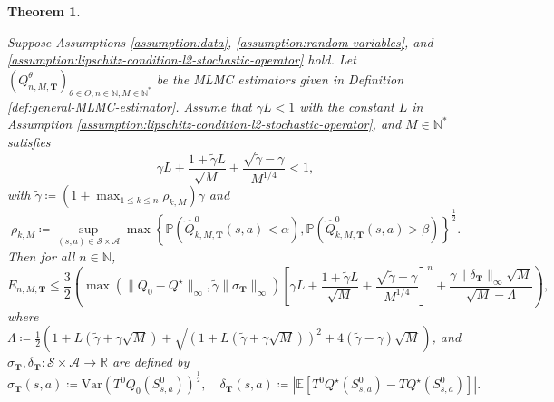 \documentclass[11pt]{article}
\numberwithin{equation}{section}
\newtheorem{theorem}{Theorem}[section]
\theoremstyle{definition}
\theoremstyle{remark}
\def\cA{\mathcal{A}}
\def\cS{\mathcal{S}}
\def\N{{\mathbb{N}}}
\def\R{{\mathbb R}}
\begin{document}
\begin{theorem}
    \label{thm:global-MLMC-error}

Suppose Assumptions \ref{assumption:data},
  \ref{assumption:random-variables}, 
  and \ref{assumption:lipschitz-condition-l2-stochastic-operator}
  hold. 
  Let $\left(Q^\theta_{n,M,\mathbf T}\right)_{\theta\in \Theta,n\in \N,M\in \N^*}$ be the MLMC estimators given in Definition \ref{def:general-MLMC-estimator}. 
  Assume that $\gamma L < 1$
  with the constant   $L$ in Assumption \ref{assumption:lipschitz-condition-l2-stochastic-operator},
  and   $M \in \N^*$ satisfies  
  \begin{equation}
    \label{eq:condition-M}
      \gamma L + \frac{1 + \tilde{\gamma} L}{\sqrt{M}} + \frac{\sqrt{\tilde{\gamma} - \gamma}}{M^{1/4}} < 1,
  \end{equation}
with  
       $ \tilde{\gamma} \coloneqq (1 + \max_{1\le k \leq n} \rho_{k,M}) \gamma$ and
    \begin{equation}
        \label{eq:def-rho}
      \rho_{k,M} \coloneqq \sup_{(s,a) \in \cS \times \cA}\max \left\{ \mathbb P \left(\hat{Q}^0_{k,M,\mathbf T}(s,a) < \alpha \right), \mathbb P \left(\hat Q^0_{k,M,\mathbf T} (s,a) > \beta \right)\right\}^{\frac{1}{2}}.
    \end{equation}
  Then  for all $n \in \N$,
    \begin{equation}
        \label{eq:final-MLMC-error}
        E_{n,M,\mathbf T} \leq 
             \frac{3}{2}\left(\max\left( \| Q_0 - Q^\star\|_{\infty},  \tilde{\gamma} \| \sigma_{\mathbf T} \|_{\infty} \right) \left[\gamma L + \frac{1 + \tilde{\gamma} L}{\sqrt{M}} + \frac{\sqrt{\tilde{\gamma} - \gamma}}{M^{1/4}} \right]^n + \frac{\gamma \|\delta_{\mathbf T} \|_{\infty}\sqrt{M} }{\sqrt{M} - \Lambda} \right),
    \end{equation}
     where 
        $\Lambda \coloneqq  \frac{1}{2}\left(1 + L(\tilde{\gamma} + \gamma \sqrt{M}) + \sqrt{\left(1 + L(\tilde{\gamma} + \gamma \sqrt{M})\right)^2 + 4 (\tilde{\gamma} - \gamma)\sqrt{M}}\right)$,
    and
    $\sigma_{\mathbf T},  \delta_{\mathbf T}:\cS\times \cA\to \R$
    are  defined by   \begin{equation}
        \label{eq:def-sigma-t}
        \sigma_{\mathbf T}(s,a)  \coloneqq \mathrm{Var} \left(T^0 Q_0 \left(S^0_{s,a}\right)\right)^{\frac{1}{2}},
        \quad
        \delta_{\mathbf T}(s,a) \coloneqq \left| \mathbb E \left[ T^0Q^\star\left(S^0_{s,a}\right) - TQ ^{\star}\left(S^0_{s,a}\right)\right] \right|.
    \end{equation}
\end{theorem}
\end{document}
